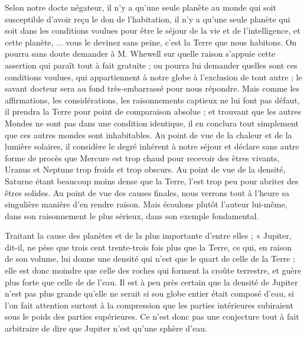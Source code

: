 \documentclass[a4paper, 11pt, oneside, landscape]{article}
\begin{document}
Selon notre docte négateur, il n'y a qu'une seule planète au monde qui soit susceptible d'avoir reçu le don de l'habitation, il n'y a qu'une seule planète qui soit dans les conditions voulues pour être le séjour de la vie et de l'intelligence, et cette planète, ... vous le devinez sans peine, c'est la Terre que nous habitons. On pourra sans doute demander à M. Whewell sur quelle raison s'appuie cette assertion qui paraît tout à fait gratuite ; ou pourra lui demander quelles sont ces conditions voulues, qui appartiennent à notre globe à l'exclusion de tout autre ; le savant docteur sera au fond très-embarrassé pour nous répondre. Mais comme les affirmations, les considérations, les raisonnements captieux ne lui font pas défaut, il prendra la Terre pour point de comparaison absolue ; et trouvant que les autres Mondes ne sont pas dans une condition identique, il en conclura tout simplement que ces autres mondes sont inhabitables. Au point de vue de la chaleur et de la lumière solaires, il considère le degré inhérent à notre séjour et déclare sans autre forme de procès que Mercure est trop chaud pour recevoir des êtres vivants, Uranus et Neptune trop froids et trop obscurs. Au point de vue de la densité, Saturne étant beaucoup moins dense que la Terre, l'est trop peu pour abriter des êtres solides. Au point de vue des causes finales, nous verrons tout à l'heure sa singulière manière d'en rendre raison. Mais écoulons plutôt l'auteur lui-même, dans son raisonnement le plus sérieux, dans son exemple fondamental.

Traitant la cause des planètes et de la plus importante d'entre elles ; « Jupiter, dit-il, ne pèse que trois cent trente-trois fois plus que la Terre, ce qui, en raison de son volume, lui donne une densité qui n'est que le quart de celle de la Terre ; elle est donc moindre que celle des roches qui forment la croûte terrestre, et guère plus forte que celle de de l'eau. Il est à peu près certain que la densité de Jupiter n'est pas plus grande qu'elle ne serait si sou globe entier était composé d'eau, si l'on fait attention surtout à la compression que les parties intérieures subiraient sous le poids des parties supérieures. Ce n'est donc pas une conjecture tout à fait arbitraire de dire que Jupiter n'est qu'une sphère d'eau.
\end{document}
